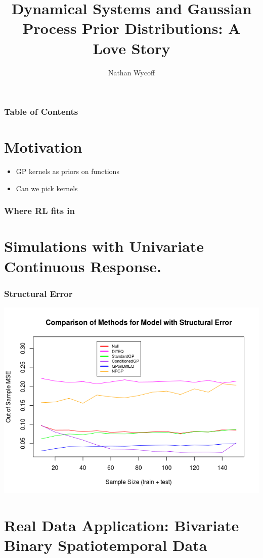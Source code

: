 \documentclass{beamer}
\title %
{Dynamical Systems and Gaussian Process \newline Prior  Distributions: A Love Story}
\author{Nathan Wycoff}
\institute[Virginia Tech] %
{
	Virginia Tech
}
\begin{document}
	\frame{\titlepage}
	
	\begin{frame}
		\frametitle{Table of Contents}
		\tableofcontents
	\end{frame}
	
	\section[Section]{Motivation}
	
	\begin{frame}
		\frame{LMAO}
		
		\begin{itemize}
			\item GP kernels as priors on functions
			\item Can we pick kernels 
		\end{itemize}
		
	\end{frame}
	
	\begin{frame}
		\frametitle{Where RL fits in}
			
	\end{frame}
	
	\section[Section]{Simulations with Univariate Continuous Response.}
	
	\begin{frame}
		\frametitle{Structural Error}
		
		\includegraphics[scale=0.6]{PrezImage1.png}
		
	\end{frame}
	
	\section[Section]{Real Data Application: Bivariate Binary Spatiotemporal Data}
	
	
\end{document}
